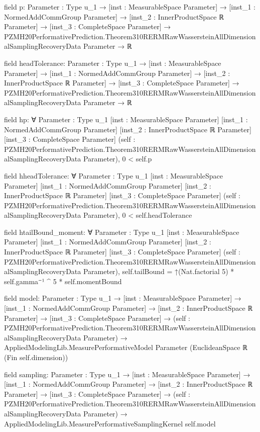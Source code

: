 \documentclass[10pt]{article}
\begin{document}
\begin{ReviewVerbatim}
field p:
{Parameter : Type u_1} →
  [inst : MeasurableSpace Parameter] →
    [inst_1 : NormedAddCommGroup Parameter] →
      [inst_2 : InnerProductSpace ℝ Parameter] →
        [inst_3 : CompleteSpace Parameter] →
          PZMH20PerformativePrediction.Theorem310RERMRawWassersteinAllDimensionalSamplingRecoveryData Parameter → ℝ

field headTolerance:
{Parameter : Type u_1} →
  [inst : MeasurableSpace Parameter] →
    [inst_1 : NormedAddCommGroup Parameter] →
      [inst_2 : InnerProductSpace ℝ Parameter] →
        [inst_3 : CompleteSpace Parameter] →
          PZMH20PerformativePrediction.Theorem310RERMRawWassersteinAllDimensionalSamplingRecoveryData Parameter → ℝ

field hp:
∀ {Parameter : Type u_1} [inst : MeasurableSpace Parameter] [inst_1 : NormedAddCommGroup Parameter]
  [inst_2 : InnerProductSpace ℝ Parameter] [inst_3 : CompleteSpace Parameter]
  (self : PZMH20PerformativePrediction.Theorem310RERMRawWassersteinAllDimensionalSamplingRecoveryData Parameter),
  0 < self.p

field hheadTolerance:
∀ {Parameter : Type u_1} [inst : MeasurableSpace Parameter] [inst_1 : NormedAddCommGroup Parameter]
  [inst_2 : InnerProductSpace ℝ Parameter] [inst_3 : CompleteSpace Parameter]
  (self : PZMH20PerformativePrediction.Theorem310RERMRawWassersteinAllDimensionalSamplingRecoveryData Parameter),
  0 < self.headTolerance

field htailBound_moment:
∀ {Parameter : Type u_1} [inst : MeasurableSpace Parameter] [inst_1 : NormedAddCommGroup Parameter]
  [inst_2 : InnerProductSpace ℝ Parameter] [inst_3 : CompleteSpace Parameter]
  (self : PZMH20PerformativePrediction.Theorem310RERMRawWassersteinAllDimensionalSamplingRecoveryData Parameter),
  self.tailBound = ↑(Nat.factorial 5) * self.gamma⁻¹ ^ 5 * self.momentBound

field model:
{Parameter : Type u_1} →
  [inst : MeasurableSpace Parameter] →
    [inst_1 : NormedAddCommGroup Parameter] →
      [inst_2 : InnerProductSpace ℝ Parameter] →
        [inst_3 : CompleteSpace Parameter] →
          (self :
              PZMH20PerformativePrediction.Theorem310RERMRawWassersteinAllDimensionalSamplingRecoveryData Parameter) →
            AppliedModelingLib.MeasurePerformativeModel Parameter (EuclideanSpace ℝ (Fin self.dimension))

field sampling:
{Parameter : Type u_1} →
  [inst : MeasurableSpace Parameter] →
    [inst_1 : NormedAddCommGroup Parameter] →
      [inst_2 : InnerProductSpace ℝ Parameter] →
        [inst_3 : CompleteSpace Parameter] →
          (self :
              PZMH20PerformativePrediction.Theorem310RERMRawWassersteinAllDimensionalSamplingRecoveryData Parameter) →
            AppliedModelingLib.MeasurePerformativeSamplingKernel self.model


\end{ReviewVerbatim}
\end{document}
